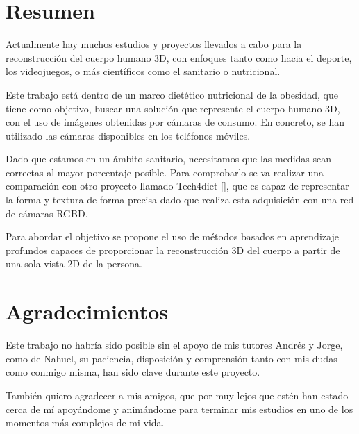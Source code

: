 
\chapter*{Resumen}
\thispagestyle{empty}


Actualmente hay muchos estudios y proyectos llevados a cabo para la reconstrucción del cuerpo humano 3D, con enfoques tanto como hacia el deporte, los videojuegos, o más científicos como el sanitario o nutricional.   

Este trabajo está dentro de un marco dietético nutricional de la obesidad, que tiene como objetivo, buscar una solución que represente el cuerpo humano 3D, con el uso de imágenes obtenidas por cámaras de consumo. En concreto, se han utilizado las cámaras disponibles en los teléfonos móviles. 

Dado que estamos en un ámbito sanitario, necesitamos que las medidas sean correctas al mayor porcentaje posible. Para comprobarlo se va realizar una comparación con otro proyecto llamado Tech4diet [\cite{tech}], que es capaz de representar la forma y textura de forma precisa dado que realiza esta adquisición con una red de cámaras RGBD. 

Para abordar el objetivo se propone el uso de métodos basados en aprendizaje profundos capaces de proporcionar la reconstrucción 3D del cuerpo a partir de una sola vista 2D de la persona.


\cleardoublepage %
\chapter*{Agradecimientos
}

\thispagestyle{empty}
\vspace{1cm}

Este trabajo no habría sido posible sin el apoyo de mis tutores Andrés y Jorge, como de Nahuel, su paciencia, disposición y comprensión tanto con mis dudas como conmigo misma, han sido clave durante este proyecto.

También quiero agradecer a mis amigos, que por muy lejos que estén han estado cerca de mí apoyándome y animándome para terminar mis estudios en uno de los momentos más complejos de mi vida.

